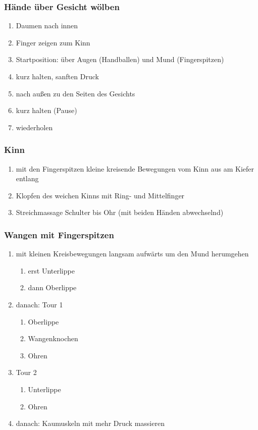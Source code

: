 \subsubsection{Hände über Gesicht wölben}
\begin{enumerate}
\item Daumen nach innen
\item Finger zeigen zum Kinn
\item Startposition: über Augen (Handballen) und Mund (Fingerspitzen)
\item kurz halten, sanften Druck
\item nach außen zu den Seiten des Gesichts
\item kurz halten (Pause)
\item wiederholen
\end{enumerate}

\subsubsection{Kinn}
\begin{enumerate}
\item mit den Fingerspitzen kleine kreisende Bewegungen vom Kinn aus am Kiefer entlang
\item Klopfen des weichen Kinns mit Ring- und Mittelfinger
\item Streichmassage Schulter bis Ohr (mit beiden Händen abwechselnd)
\end{enumerate}

\subsubsection{Wangen mit Fingerspitzen}
\begin{enumerate}
\item mit kleinen Kreisbewegungen langsam aufwärts um den Mund herumgehen
	\begin{enumerate}
	\item erst Unterlippe
	\item dann Oberlippe
	\end{enumerate}
\item danach: Tour 1
	\begin{enumerate}
	\item Oberlippe
	\item Wangenknochen
	\item Ohren
	\end{enumerate}
\item Tour 2
	\begin{enumerate}
	\item Unterlippe
	\item Ohren
	\end{enumerate}
\item danach: Kaumuskeln mit mehr Druck massieren
\end{enumerate}


